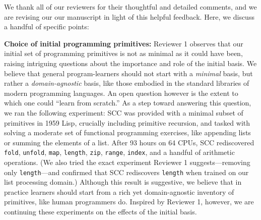 \documentclass{article}
\begin{document}
We thank all of our reviewers for their thoughtful and detailed comments, and we are revising our our manuscript in light of this helpful feedback.
Here, we discuss a handful of specific points:

\textbf{Choice of initial programming primitives:} Reviewer 1 observes that our initial set of programming primitives is
not as minimal as it could have been,
raising intriguing questions
about the importance and role of the initial basis.
We believe that general program-learners should not start with a \emph{minimal} basis,
but rather a \emph{domain-agnostic}
basis,
like those embodied in the standard libraries of modern programming languages.
An open question however is the extent to which one could ``learn from scratch.''
As a step toward answering this question,
we ran the following experiment:
SCC was provided with a minimal subset of primitives in 1959 Lisp, crucially including primitive recursion,
and tasked with solving a moderate set of functional programming exercises, like appending lists or summing the elements of a list.
After 93 hours on 64 CPUs,
SCC rediscovered \texttt{fold}, \texttt{unfold}, \texttt{map},
\texttt{length}, \texttt{zip}, \texttt{range}, \texttt{index},
and a handful of arithmetic operations.
(We also tried the exact experiment Reviewer 1 suggests---removing only \texttt{length}---and confirmed that SCC rediscovers \texttt{length} when trained on our list processing domain.)
Although this result is suggestive,
we believe that in practice learners should start from a rich yet domain-agnostic
inventory of primitives, like human programmers do.
Inspired by Reviewer 1, however,
we are continuing these experiments on the effects of
the initial basis.


\end{document}
